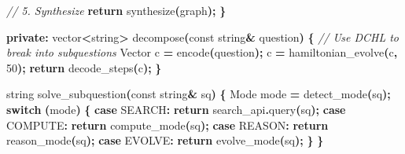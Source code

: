 \documentclass[
  11pt,
  a4paper,
]{article}
\newenvironment{Shaded}{\begin{snugshade}}{\end{snugshade}}
\newcommand{\AttributeTok}[1]{\textcolor[rgb]{0.13,0.29,0.53}{#1}}
\newcommand{\CommentTok}[1]{\textcolor[rgb]{0.56,0.35,0.01}{\textit{#1}}}
\newcommand{\ControlFlowTok}[1]{\textcolor[rgb]{0.13,0.29,0.53}{\textbf{#1}}}
\newcommand{\DecValTok}[1]{\textcolor[rgb]{0.00,0.00,0.81}{#1}}
\newcommand{\KeywordTok}[1]{\textcolor[rgb]{0.13,0.29,0.53}{\textbf{#1}}}
\newcommand{\NormalTok}[1]{#1}
\newcommand{\OperatorTok}[1]{\textcolor[rgb]{0.81,0.36,0.00}{\textbf{#1}}}
\begin{document}
\begin{Shaded}
\begin{Highlighting}[]
        \CommentTok{// 5. Synthesize}
        \ControlFlowTok{return}\NormalTok{ synthesize}\OperatorTok{(}\NormalTok{graph}\OperatorTok{);}
    \OperatorTok{\}}
    
\KeywordTok{private}\OperatorTok{:}
\NormalTok{    vector}\OperatorTok{\textless{}}\NormalTok{string}\OperatorTok{\textgreater{}}\NormalTok{ decompose}\OperatorTok{(}\AttributeTok{const}\NormalTok{ string}\OperatorTok{\&}\NormalTok{ question}\OperatorTok{)} \OperatorTok{\{}
        \CommentTok{// Use DCHL to break into subquestions}
\NormalTok{        Vector c }\OperatorTok{=}\NormalTok{ encode}\OperatorTok{(}\NormalTok{question}\OperatorTok{);}
\NormalTok{        c }\OperatorTok{=}\NormalTok{ hamiltonian\_evolve}\OperatorTok{(}\NormalTok{c}\OperatorTok{,} \DecValTok{50}\OperatorTok{);}
        \ControlFlowTok{return}\NormalTok{ decode\_steps}\OperatorTok{(}\NormalTok{c}\OperatorTok{);}
    \OperatorTok{\}}
    
\NormalTok{    string solve\_subquestion}\OperatorTok{(}\AttributeTok{const}\NormalTok{ string}\OperatorTok{\&}\NormalTok{ sq}\OperatorTok{)} \OperatorTok{\{}
\NormalTok{        Mode mode }\OperatorTok{=}\NormalTok{ detect\_mode}\OperatorTok{(}\NormalTok{sq}\OperatorTok{);}
        \ControlFlowTok{switch} \OperatorTok{(}\NormalTok{mode}\OperatorTok{)} \OperatorTok{\{}
            \ControlFlowTok{case}\NormalTok{ SEARCH}\OperatorTok{:} \ControlFlowTok{return}\NormalTok{ search\_api}\OperatorTok{.}\NormalTok{query}\OperatorTok{(}\NormalTok{sq}\OperatorTok{);}
            \ControlFlowTok{case}\NormalTok{ COMPUTE}\OperatorTok{:} \ControlFlowTok{return}\NormalTok{ compute\_mode}\OperatorTok{(}\NormalTok{sq}\OperatorTok{);}
            \ControlFlowTok{case}\NormalTok{ REASON}\OperatorTok{:} \ControlFlowTok{return}\NormalTok{ reason\_mode}\OperatorTok{(}\NormalTok{sq}\OperatorTok{);}
            \ControlFlowTok{case}\NormalTok{ EVOLVE}\OperatorTok{:} \ControlFlowTok{return}\NormalTok{ evolve\_mode}\OperatorTok{(}\NormalTok{sq}\OperatorTok{);}
        \OperatorTok{\}}
    \OperatorTok{\}}
    

\end{Highlighting}
\end{Shaded}
\end{document}

